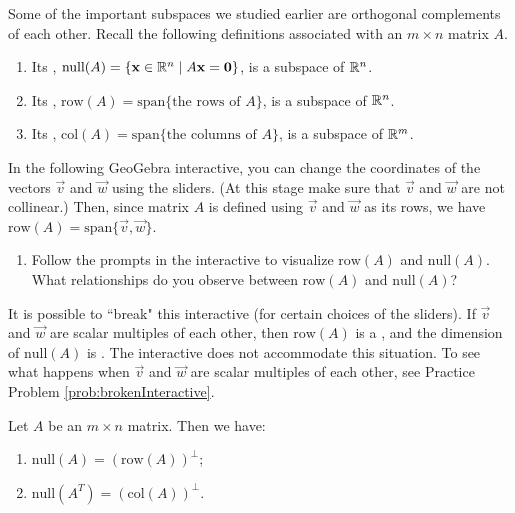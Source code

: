 \documentclass{ximera}
\begin{document}
Some of the important subspaces we studied earlier are orthogonal complements of each other.  Recall the following definitions associated with an $m \times n$ matrix $A$.
\begin{enumerate}
    \item Its , $\mbox{null}(A) = \{\mathbf{x}\in \mathbb{R}^n \mid A\mathbf{x} = \mathbf{0}\}$, is a subspace of $\mathbb{R}^n$.
    \item Its , $\mbox{row}(A) = \mbox{span} \{ \mbox{the rows of } A\}$, is a subspace of $\mathbb{R}^n$.
    \item Its , $\mbox{col}(A) = \mbox{span} \{ \mbox{the columns of } A\}$, is a subspace of $\mathbb{R}^m$.
\end{enumerate}

\begin{exploration}\label{exp:discoverortho}
In the following GeoGebra interactive, you can change the coordinates of the vectors $\vec{v}$ and $\vec{w}$ using the sliders.  (At this stage make sure that $\vec{v}$ and $\vec{w}$ are not collinear.) Then, since matrix $A$ is defined using $\vec{v}$ and $\vec{w}$ as its rows, we have $\mbox{row}(A) = \mbox{span}\{\vec{v},\vec{w}\}$.  
   
\begin{center}
\end{center}

\begin{enumerate}
        \item Follow the prompts in the interactive to visualize $\mbox{row}(A)$ and $\mbox{null}(A)$.  What relationships do you observe between $\mbox{row}(A)$ and $\mbox{null}(A)$? 
        \end{enumerate}

  It is possible to ``break" this interactive (for certain choices of the sliders). If $\vec{v}$ and $\vec{w}$ are scalar multiples of each other, then $\mbox{row}(A)$ is a , and the dimension of $\mbox{null}(A)$ is .  The interactive does not accommodate this situation.  To see what happens when $\vec{v}$ and $\vec{w}$ are scalar multiples of each other, see Practice Problem \ref{prob:brokenInteractive}.
\end{exploration}


\begin{theorem}\label{th:4subspaces}
Let $A$ be an $m \times n$ matrix.  Then we have:
\begin{enumerate}
\item\label{th:4subspacesa} $\mbox{null}(A) = (\mbox{row}(A))^\perp$;
\item\label{th:4subspacesb} $\mbox{null}(A^T) = (\mbox{col}(A))^\perp$.
\end{enumerate}
\end{theorem}
\end{document}

